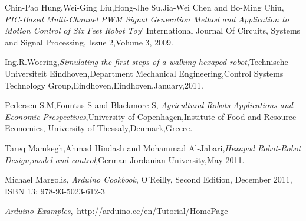 \documentclass{report}
\begin{document}
\renewcommand{\bibname}{REFERENCES}
\begin{thebibliography}{9}

  Chin-Pao Hung,Wei-Ging Liu,Hong-Jhe Su,Jia-Wei Chen and Bo-Ming Chiu, 
  \emph{PIC-Based Multi-Channel PWM Signal Generation Method and Application to Motion Control of Six Feet Robot Toy}'
  International Journal Of Circuits, Systems and Signal Processing,
  Issue 2,Volume 3,
  2009.

Ing.R.Woering,\emph{Simulating the first steps of a walking hexapod robot},Technische Universiteit Eindhoven,Department Mechanical Engineering,Control Systems Technology Group,Eindhoven,Eindhoven,January,2011.

Pedersen S.M,Fountas S and Blackmore S,
\emph{Agricultural Robots-Applications and Economic Prespectives},University of Copenhagen,Institute of Food and Resource Economics, University of Thessaly,Denmark,Greece.

Tareq Mamkegh,Ahmad Hindash and Mohammad Al-Jabari,\emph{Hexapod Robot-Robot Design,model and control},German Jordanian University,May 2011.

Michael Margolis,
\emph{Arduino Cookbook},
O'Reilly,
Second Edition,
December 2011,
ISBN 13: 978-93-5023-612-3

\emph{Arduino Examples},\ \hyperref[tosee]{\color{red}\url{http://arduino.cc/en/Tutorial/HomePage}}

\end{thebibliography}
\end{document}
